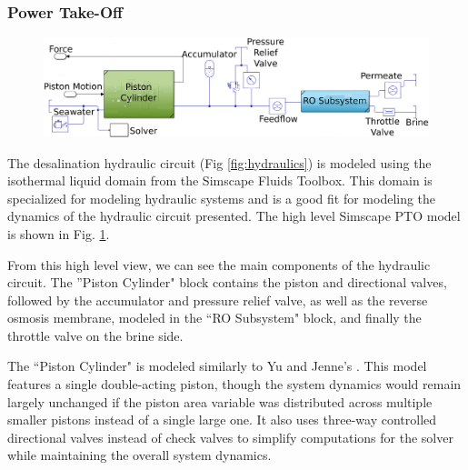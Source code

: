 \documentclass[twocolumn,10pt]{asme2e}
\begin{document}

\subsubsection{Power Take-Off}

\begin{figure}  %
    \centering
    \includegraphics[width=0.8\linewidth]{../figs/simscape_hydraulics.pdf}
    \label{fig:hydraulic_simscape}
\end{figure}

The desalination hydraulic circuit (Fig \ref{fig:hydraulics}) is modeled using the isothermal liquid domain from the Simscape Fluids Toolbox. This domain is specialized for modeling hydraulic systems and is a good fit for modeling the dynamics of the hydraulic circuit presented. The high level Simscape PTO model is shown in Fig. \ref{fig:hydraulic_simscape}.

From this high level view, we can see the main components of the hydraulic circuit. The ''Piston Cylinder" block contains the piston and directional valves, followed by the accumulator and pressure relief valve, as well as the reverse osmosis membrane, modeled in the ``RO Subsystem" block, and finally the throttle valve on the brine side.

The ``Piston Cylinder" is modeled similarly to Yu and Jenne's \cite{Yu2018} . This model features a single double-acting piston, though the system dynamics would remain largely unchanged if the piston area variable was distributed across multiple smaller pistons instead of a single large one. It also uses three-way controlled directional valves instead of check valves to simplify computations for the solver while maintaining the overall system dynamics.

\end{document}
